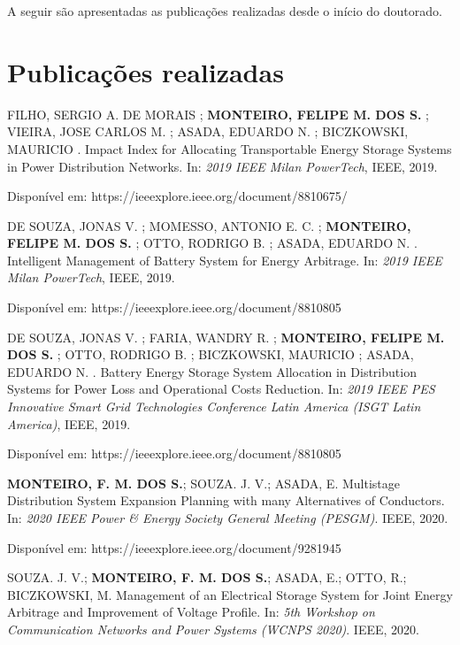 A seguir são apresentadas as publicações realizadas desde o início do doutorado.


\section{Publicações realizadas}

\noindent FILHO, SERGIO A. DE MORAIS ; \textbf{MONTEIRO, FELIPE M. DOS S.} ; VIEIRA, JOSE CARLOS M. ; ASADA, EDUARDO N. ; BICZKOWSKI, MAURICIO . Impact Index for Allocating Transportable Energy Storage Systems in Power Distribution Networks. In: \textit{2019 IEEE Milan PowerTech}, IEEE, 2019. 

\noindent Disponível em:
https://ieeexplore.ieee.org/document/8810675/

\vspace{1cm}
\noindent DE SOUZA, JONAS V. ; MOMESSO, ANTONIO E. C. ; \textbf{MONTEIRO, FELIPE M. DOS S.} ; OTTO, RODRIGO B. ; ASADA, EDUARDO N. . Intelligent Management of Battery System for Energy Arbitrage. In: \textit{2019 IEEE Milan PowerTech}, IEEE, 2019. 

\noindent Disponível em:
https://ieeexplore.ieee.org/document/8810805

\vspace{1cm}
\noindent  DE SOUZA, JONAS V. ; FARIA, WANDRY R. ; \textbf{MONTEIRO, FELIPE M. DOS S.} ; OTTO, RODRIGO B. ; BICZKOWSKI, MAURICIO ; ASADA, EDUARDO N. . Battery Energy Storage System Allocation in Distribution Systems for Power Loss and Operational Costs Reduction. In: \textit{2019 IEEE PES Innovative Smart Grid Technologies Conference Latin America (ISGT Latin America)}, IEEE, 2019.

\noindent Disponível em:
https://ieeexplore.ieee.org/document/8810805

\newpage
\vspace{1cm}
\noindent \textbf{MONTEIRO, F. M. DOS S.}; SOUZA. J. V.; ASADA, E. Multistage Distribution System Expansion Planning with many Alternatives of Conductors. In: \textit{ 2020 IEEE Power \& Energy Society General Meeting (PESGM)}. IEEE, 2020. 

\noindent Disponível em: https://ieeexplore.ieee.org/document/9281945

\vspace{1cm}
\noindent SOUZA. J. V.; \textbf{MONTEIRO, F. M. DOS S.};  ASADA, E.; OTTO, R.; BICZKOWSKI, M. Management of an Electrical Storage System for Joint Energy Arbitrage and Improvement of Voltage Profile. In: \textit{5th Workshop on Communication Networks and Power Systems (WCNPS 2020)}. IEEE, 2020. 

